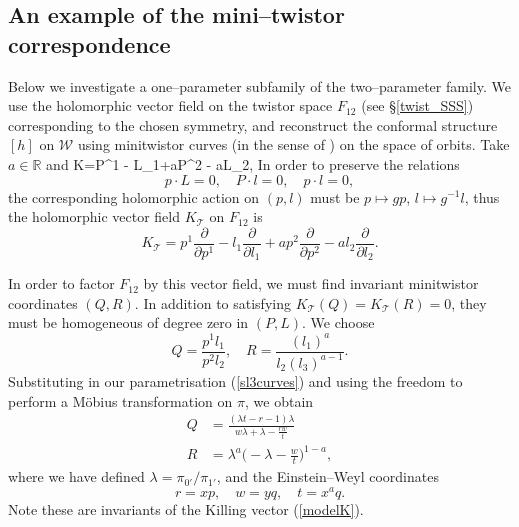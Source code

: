 \subsection{An example of the mini--twistor correspondence}
\label{mini_twistor}
Below we investigate a one--parameter subfamily of the two--parameter family. We use the holomorphic vector field on 
the twistor space
$F_{12}$  (see \S\ref{twist_SSS})
corresponding to the chosen symmetry, and reconstruct the conformal structure $[h]$ on $\mathcal{W}$ using minitwistor curves 
(in the sense of \cite{hitchin})
on the space of orbits. Take $a\in \mathbb{R}$ and
\be
\label{modelK}
K=P^1 - L_1+aP^2 - aL_2,
\ee
In order to preserve the relations
\[
p\cdot L=0,\quad P\cdot l=0,\quad p\cdot l=0, 
\]
the corresponding holomorphic action on $(p,l)$ must be $p\mapsto gp$, $l\mapsto g^{-1}l$, thus the holomorphic vector field $ K_\mathscr{T}$ on $F_{12}$ is
\[
 K_\mathscr{T}=p^1\frac{\partial}{\partial p^1} - l_1\frac{\partial}{\partial l_1}+ap^2\frac{\partial}{\partial p^2} - al_2\frac{\partial}{\partial l_2}.
\]

In order to factor $F_{12}$ by this vector field, we must find invariant minitwistor coordinates $(Q,R)$. In addition to satisfying $ K_\mathscr{T}(Q)= K_\mathscr{T}(R)=0$, they must be homogeneous of degree zero in $(P,L)$. We choose
\[
Q=\frac{p^1l_1}{p^2l_2},\quad R=\frac{(l_1)^a}{l_2(l_3)^{a-1}}.
\]
Substituting in our parametrisation (\ref{sl3curves}) and using the freedom to perform a Möbius transformation on $\pi$, we obtain
\begin{align}
\label{QR}
Q &= \frac{(\lambda t-r-1)\lambda}{w\lambda+\lambda-\frac{rw}{t}}\\
R &= \lambda^a\Big(-\lambda-\frac{w}{t}\Big)^{1-a},\nonumber
\end{align}
where we have defined $\lambda=\pi_{0'}/\pi_{1'}$, and the Einstein--Weyl coordinates
\[
r=xp,\quad w=yq, \quad t=x^aq.
\]
Note these are invariants of the Killing vector (\ref{modelK}).

